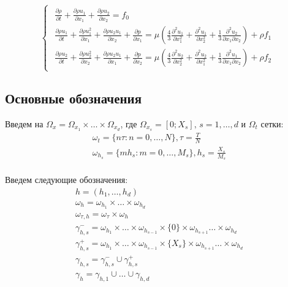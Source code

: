 \begin{equation} \label{eq:task_reformulate}
	\begin{cases}
		\begin{array}{l}
			\frac{\partial \rho}{\partial t} + \frac{\partial \rho u_1}{\partial x_1} + \frac{\partial \rho u_2}{\partial x_2} = f_0 \\
			\frac{\partial \rho u_1}{\partial t} + \frac{\partial \rho u_1^2}{\partial x_1} + \frac{\partial \rho u_2 u_1}{\partial x_2} + \frac{\partial p}{\partial x_1} = \mu \left( \frac{4}{3} \frac{\partial^2 u_1}{\partial x_1^2} + \frac{\partial^2 u_1}{\partial x_2^2} + \frac{1}{3} \frac{\partial ^2 u_2}{\partial x_1 \partial x_2} \right) + \rho f_1 \\
			\frac{\partial \rho u_2}{\partial t} + \frac{\partial \rho u_2^2}{\partial x_2} + \frac{\partial \rho u_2 u_1}{\partial x_1} + \frac{\partial p}{\partial x_2} = \mu \left( \frac{4}{3} \frac{\partial^2 u_2}{\partial x_2^2} + \frac{\partial^2 u_2}{\partial x_1^2} + \frac{1}{3} \frac{\partial^2 u_1}{\partial x_1 \partial x_2} \right) + \rho f_2
		\end{array}
	\end{cases}
\end{equation}

\subsection{Основные обозначения}
Введем на $\Omega_x = \Omega_{x_1} \times \dots \times \Omega_{x_d}$, где $\Omega_{x_s} = [0; X_s], \, s=1,\dots, d$ и $\Omega_t$ сетки:
\begin{equation}
	\begin{array}{lc}
		\omega_t = \{n\tau: n = 0, \dots, N\}, \tau = \frac{T}{N}\\
		\omega_{h_s} = \{mh_s: m = 0, \dots, M_s\}, h_s = \frac{X_s}{M_s}\\
	\end{array}
\end{equation}

Введем следующие обозначения:
\begin{equation}
	\begin{array}{lc}
		h=(h_1, \dots, h_d)\\
		\omega_h=\omega_{h_1}\times\dots\times \omega_{h_d}\\
		\omega_{\tau, h} = \omega_{\tau} \times \omega_h\\
		\gamma_{h,s}^- = \omega_{h_1} \times \dots \times \omega_{h_{s-1}}\times\{0\}\times \omega_{h_{s+1}} \dots \times \omega_{h_d} \\
		\gamma_{h,s}^+ = \omega_{h_1} \times \dots \times \omega_{h_{s-1}}\times\{X_s\}\times \omega_{h_{s+1}} \dots \times \omega_{h_d} \\
		\gamma_{h,s} = \gamma_{h,s}^- \cup \gamma_{h,s}^+ \\
		\gamma_{h} = \gamma_{h,1} \cup \dots \cup \gamma_{h,d}
	\end{array}
\end{equation}

